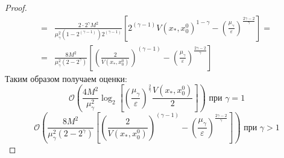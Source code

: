 \begin{proof}
\[\begin{aligned}
           =& \frac{2 \cdot 2^{\gamma} M^2}{\mu_{\gamma}^2 (1 - 2^{(\gamma-1)}) 2^{(\gamma - 1)}} \left[2^{(\gamma - 1)}V(x_*, x_0^0)^{1 - \gamma}  - \left(\frac{\mu_{\gamma}}{\varepsilon}\right)^{\frac{2\gamma - 2}{\gamma}}\right] = \\ 
           =& \frac{8  M^2}{\mu_{\gamma}^2 (2 - 2^{\gamma})} \left[\left(\frac{2}{V(x_*, x_0^0)}\right)^{(\gamma - 1)}  - \left(\frac{\mu_{\gamma}}{\varepsilon}\right)^{\frac{2\gamma - 2}{\gamma}}\right] 
       \end{aligned}
       \]
       Таким образом получаем оценки:
       \[
           \mathcal{O} \left( \frac{4 M^2}{\mu_{\gamma}^2} \log_2{\left[\left(\frac{\mu_{\gamma}}{\varepsilon}\right)^{\frac{2}{\gamma}} \frac{V(x_*, x_0^0)}{2}\right]}\right) \text{ при } \gamma = 1
       \]
       \[
           \mathcal{O} \left( \frac{8  M^2}{\mu_{\gamma}^2 (2 - 2^{\gamma})} \left[ \left(\frac{2}{V(x_*, x_0^0)}\right)^{(\gamma - 1)}  - \left(\frac{\mu_{\gamma}}{\varepsilon}\right)^{\frac{2\gamma - 2}{\gamma}} \right]\right) \text{ при } \gamma > 1
       \]
       

\end{proof}
